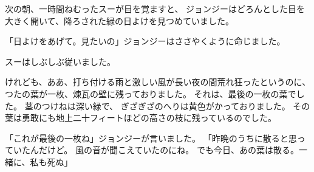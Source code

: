 次の朝、一時間ねむったスーが目を覚ますと、 ジョンジーはどろんとした目を大きく開いて、降ろされた緑の日よけを見つめていました。

「日よけをあげて。見たいの」ジョンジーはささやくように命じました。

スーはしぶしぶ従いました。

けれども、ああ、打ち付ける雨と激しい風が長い夜の間荒れ狂ったというのに、 つたの葉が一枚、煉瓦の壁に残っておりました。 それは、最後の一枚の葉でした。 茎のつけねは深い緑で、 ぎざぎざのへりは黄色がかっておりました。 その葉は勇敢にも地上二十フィートほどの高さの枝に残っているのでした。

「これが最後の一枚ね」ジョンジーが言いました。 「昨晩のうちに散ると思っていたんだけど。 風の音が聞こえていたのにね。 でも今日、あの葉は散る。一緒に、私も死ぬ」


